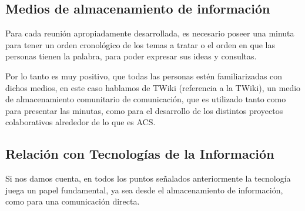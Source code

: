 \subsection{Medios de almacenamiento de información}
Para cada reunión apropiadamente desarrollada,
es necesario poseer una minuta para tener un orden
cronológico de los temas a tratar o el orden
en que las personas tienen la palabra, para poder
expresar sus ideas y consultas.

Por lo tanto es muy positivo, que todas las personas
estén familiarizadas con dichos medios, en este caso hablamos
de TWiki (referencia a la TWiki), un medio de almacenamiento
comunitario de comunicación, que es utilizado tanto como para
presentar las minutas, como para el desarrollo de los distintos
proyectos colaborativos alrededor de lo que es ACS.


\subsection{Relación con Tecnologías de la Información}

Si nos damos cuenta, en todos los puntos señalados anteriormente
la tecnología juega un papel fundamental, ya sea desde el
almacenamiento de información, como para una comunicación directa.

